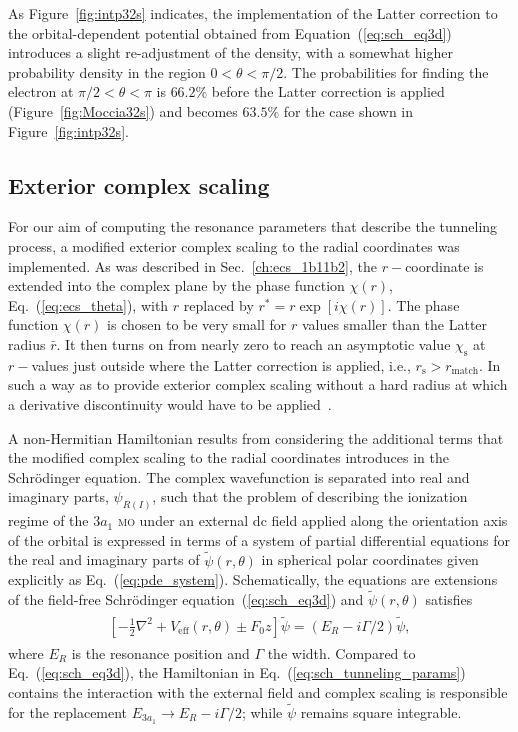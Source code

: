As Figure~\ref{fig:intp32s} indicates, the implementation of the
Latter correction to the orbital-dependent potential obtained from
Equation~(\ref{eq:sch_eq3d}) introduces a slight re-adjustment of the
density, with a somewhat higher probability density in the region $0 <
\theta < \pi/2$. The probabilities for finding the electron at $\pi/2
< \theta < \pi$ is $66.2\%$ before the Latter correction is applied
(Figure~\ref{fig:Moccia32s}) and becomes $63.5\%$ for the case shown
in Figure~\ref{fig:intp32s}.

\subsection{Exterior complex scaling}
\label{ch:3a1_ecs}

For our aim of computing the resonance parameters that describe the
tunneling process, a modified exterior complex scaling to the radial
coordinates was implemented. As was described in
Sec.~\ref{ch:ecs_1b11b2}, the $r-$coordinate is extended into the
complex plane by the phase function $\chi(r)$,
Eq.~(\ref{eq:ecs_theta}), with $r$ replaced by $r^{*} =
r\exp[i\chi(r)]$. The phase function $\chi(r)$ is chosen to be very
small for $r$ values smaller than the Latter radius $\bar{r}$. It then
turns on from nearly zero to reach an asymptotic value
$\chi_{\mathrm{s}}$ at $r-$values just outside where the Latter
correction is applied, i.e., $r_{\mathrm{s}} > r_{\mathrm{match}}$. In
such a way as to provide exterior complex scaling without a hard
radius at which a derivative discontinuity would have to be
applied~\cite{ecsScrinzi}.

A non-Hermitian Hamiltonian results from considering the additional
terms that the modified complex scaling to the radial coordinates
introduces in the Schr\"{o}dinger equation. The complex wavefunction
is separated into real and imaginary parts, $\psi_{R(I)}$, such that
the problem of describing the ionization regime of the $3a_{1}$
\textsc{mo} under an external dc field applied along the orientation
axis of the orbital is expressed in terms of a system of partial
differential equations for the real and imaginary parts of
$\widetilde{\psi}(r,\theta)$ in spherical polar coordinates given
explicitly as Eq.~(\ref{eq:pde_system}). Schematically, the equations
are extensions of the field-free Schr\"{o}dinger
equation~(\ref{eq:sch_eq3d}) and $\widetilde{\psi}(r,\theta)$
satisfies~\cite{sarias_2017}
%
\begin{eqnarray}
  \begin{split}
    \left[ -\frac{1}{2}\nabla^{2} + V_{\mathrm{eff}}(r,\theta)
      \pm F_{0}z \right] \widetilde{\psi} = (E_{R} - i\Gamma/2)
    \widetilde{\psi},
  \end{split}
  \label{eq:sch_tunneling_params}
\end{eqnarray}
%
where $E_{R}$ is the resonance position and $\Gamma$ the
width. Compared to Eq.~(\ref{eq:sch_eq3d}), the Hamiltonian in
Eq.~(\ref{eq:sch_tunneling_params}) contains the interaction with the
external field and complex scaling is responsible for the replacement
$E_{3a_{1}} \to E_{R} - i\Gamma/2$; while $\widetilde{\psi}$ remains
square integrable.

